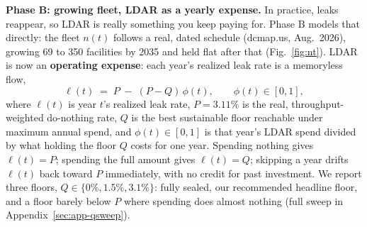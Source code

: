 \documentclass{article}
\begin{document}
\textbf{Phase B: growing fleet, LDAR as a yearly expense.} In practice,
leaks reappear, so LDAR is really something you keep paying for. Phase B
models that directly: the fleet $n(t)$ follows a real, dated schedule
(dcmap.us, Aug.\ 2026), growing 69 to 350 facilities by 2035 and held
flat after that (Fig.~\ref{fig:nt}). LDAR is now an \textbf{operating
expense}: each year's realized leak rate is a memoryless flow,
\begin{equation}
  \ell(t) \;=\; P \;-\; (P - Q)\,\phi(t), \qquad \phi(t) \in [0,1],
  \label{eq:leakrate}
\end{equation}
where $\ell(t)$ is year $t$'s realized leak rate, $P=3.11\%$ is the
real, throughput-weighted do-nothing rate, $Q$ is the best sustainable
floor reachable under maximum annual spend, and $\phi(t)\in[0,1]$ is
that year's LDAR spend divided by what holding the floor $Q$ costs for
one year. Spending nothing gives $\ell(t)=P$; spending the full amount
gives $\ell(t)=Q$; skipping a year drifts $\ell(t)$ back toward $P$
immediately, with no credit for past investment. We report three
floors, $Q\in\{0\%, 1.5\%, 3.1\%\}$: fully sealed, our recommended
headline floor, and a floor barely below $P$ where spending does almost
nothing (full sweep in Appendix~\ref{sec:app-qsweep}).
\end{document}
